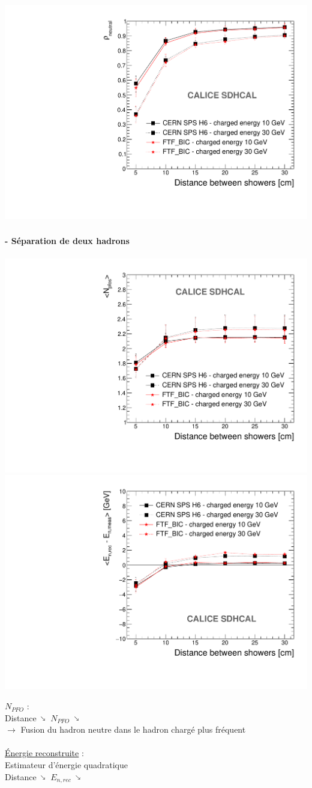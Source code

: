 \documentclass[8pt]{beamer}
\makeatletter
\newcommand{\fixed@sra}{$\vrule height 2\fontdimen22\textfont2 width 0pt\shortrightarrow$}
\newcommand{\shortarrow}[1]{%
  \mathrel{\text{\rotatebox[origin=c]{\numexpr#1*45}{\fixed@sra}}}
}
\makeatother
\begin{document}
\begin{frame}
\begin{minipage}{0.48\linewidth}
\begin{center}
        ~~~~~~~~~~~~\centering \includegraphics[width=0.8\linewidth]{OverlayEvent_Purity.pdf}
      \end{center}
    \end{minipage}
  \end{frame}

  \begin{frame}
  \frametitle{\secname}
  \framesubtitle{\subsecname - Séparation de deux hadrons}
    \begin{center}
      \includegraphics[width=0.49\linewidth]{OverlayEvent_NPfos.pdf}
      \includegraphics[width=0.49\linewidth]{OverlayEvent_EnergyDifference.pdf}
    \end{center}
    \underline{$N_{PFO}$} : \\
    Distance $\shortarrow{7}$ $N_{PFO}$ $\shortarrow{7}$ \\
    $\rightarrow$ Fusion du hadron neutre dans le hadron chargé plus fréquent \\
    ~ \\
    \underline{Énergie reconstruite} : \\
    Estimateur d'énergie quadratique \\
    Distance $\shortarrow{7}$ $E_{n,rec}$ $\shortarrow{7}$ \\
  \end{frame}
\end{document}
